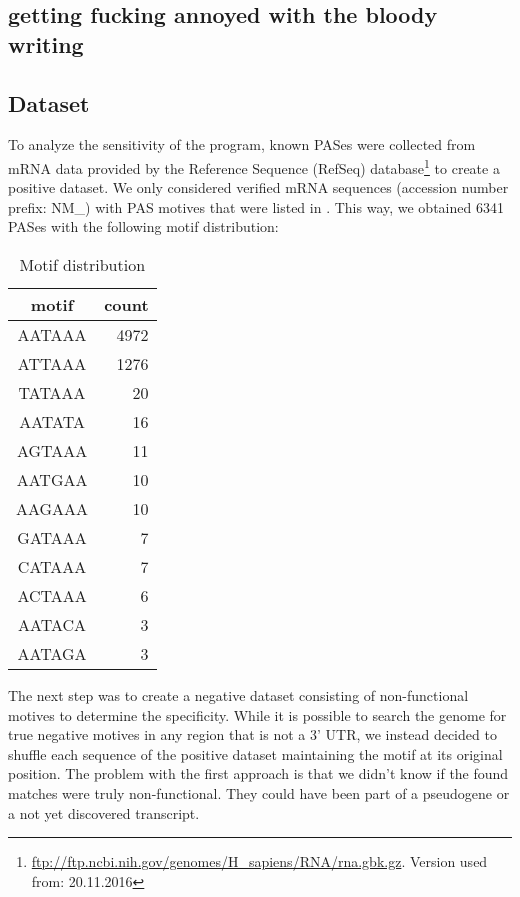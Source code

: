 \subsection{getting fucking annoyed with the bloody writing}


\subsection{Dataset}
To analyze the sensitivity of the program, known PASes were collected from mRNA data provided by the Reference Sequence (RefSeq) database\footnote{\url{ftp://ftp.ncbi.nih.gov/genomes/H_sapiens/RNA/rna.gbk.gz}. Version used from: 20.11.2016} to create a positive dataset. We only considered verified mRNA sequences (accession number prefix: NM\_) with PAS motives that were listed in \citeauthor{pmid19393560}. This way, we obtained 6341 PASes with the following motif distribution:

\begin{table}[!h]
\centering
  \begin{tabular}{c|r}
	motif & count \\
	\hline
	AATAAA & 4972 \\
	ATTAAA & 1276 \\
	TATAAA & 20 \\
	AATATA & 16 \\
	AGTAAA & 11 \\
	AATGAA & 10 \\
	AAGAAA & 10 \\
	GATAAA & 7 \\
	CATAAA & 7 \\
	ACTAAA & 6 \\
	AATACA & 3 \\
	AATAGA & 3 \\
  \end{tabular}
\caption{Motif distribution}
\label{motif_dist}
\end{table}

The next step was to create a negative dataset consisting of non-functional motives to determine the specificity. While it is possible to search the genome for true negative motives in any region that is not a 3' UTR, we instead decided to shuffle each sequence of the positive dataset maintaining the motif at its original position. The problem with the first approach is that we didn't know if the found matches were truly non-functional. They could have been part of a pseudogene or a not yet discovered transcript. 
